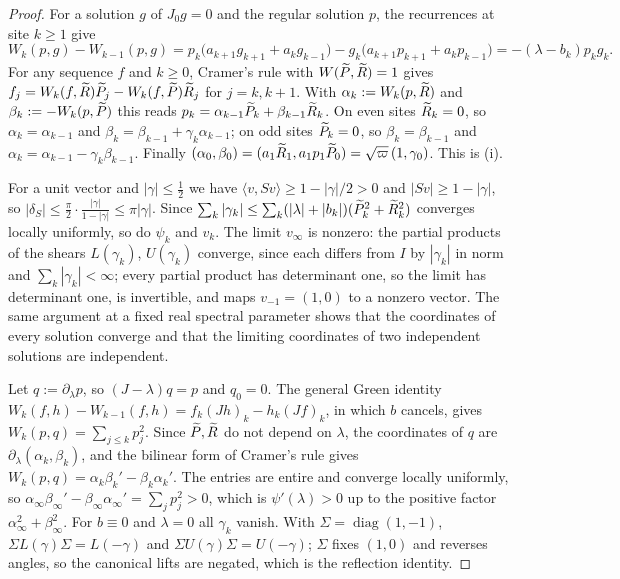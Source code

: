 \begin{proof}
 For a solution $g$ of $J_0g=0$ and the regular solution $p$, the
recurrences at site $k\ge1$ give
\[
  W_k(p,g)-W_{k-1}(p,g)=p_k\bigl(a_{k+1}g_{k+1}+a_kg_{k-1}\bigr)
  -g_k\bigl(a_{k+1}p_{k+1}+a_kp_{k-1}\bigr)=-(\lambda-b_k)p_kg_k .
\]
For any sequence $f$ and $k\ge0$, Cramer's rule with $W(\widetilde P,\widetilde R)=1$ gives
$f_j=W_k(f,\widetilde R)\widetilde P_j-W_k(f,\widetilde P)\widetilde R_j$ for $j=k,k+1$. With
$\alpha_k:=W_k(p,\widetilde R)$ and $\beta_k:=-W_k(p,\widetilde P)$ this reads
$p_k=\alpha_{k-1}\widetilde P_k+\beta_{k-1}\widetilde R_k$. On even sites $\widetilde R_k=0$, so
$\alpha_k=\alpha_{k-1}$ and $\beta_k=\beta_{k-1}+\gamma_k\alpha_{k-1}$; on odd sites
$\widetilde P_k=0$, so $\beta_k=\beta_{k-1}$ and $\alpha_k=\alpha_{k-1}-\gamma_k\beta_{k-1}$.
Finally $(\alpha_0,\beta_0)=(a_1\widetilde R_1,a_1p_1\widetilde P_0)=\sqrt{\varpi}\,(1,\gamma_0)$. This is (i).

 For a unit vector and $|\gamma|\le\frac12$ we have
$\langle v,Sv\rangle\ge1-|\gamma|/2>0$ and $|Sv|\ge1-|\gamma|$, so
$|\delta_S|\le\frac\pi2\cdot\frac{|\gamma|}{1-|\gamma|}\le\pi|\gamma|$. Since
$\sum_k|\gamma_k|\le\sum_k(|\lambda|+|b_k|)(\widetilde P_k^2+\widetilde R_k^2)$ converges locally uniformly,
so do $\psi_k$ and $v_k$. The limit $v_\infty$ is nonzero: the partial products of the shears
$L(\gamma_k)$, $U(\gamma_k)$ converge, since each differs from $I$ by $|\gamma_k|$ in norm and
$\sum_k|\gamma_k|<\infty$; every partial product has determinant one, so the limit has
determinant one, is invertible, and maps $v_{-1}=(1,0)$ to a nonzero vector. The same argument at a
fixed real spectral parameter shows that the coordinates of every solution converge and that the
limiting coordinates of two independent solutions are independent.

 Let $q:=\partial_\lambda p$, so $(J-\lambda)q=p$ and $q_0=0$. The
general Green identity $W_k(f,h)-W_{k-1}(f,h)=f_k(Jh)_k-h_k(Jf)_k$, in which $b$
cancels, gives $W_k(p,q)=\sum_{j\le k}p_j^2$. Since $\widetilde P,\widetilde R$ do not depend on $\lambda$,
the coordinates of $q$ are $\partial_\lambda(\alpha_k,\beta_k)$, and the bilinear form of
Cramer's rule gives $W_k(p,q)=\alpha_k\beta_k'-\beta_k\alpha_k'$. The entries are entire
and converge locally uniformly, so
$\alpha_\infty\beta_\infty'-\beta_\infty\alpha_\infty'=\sum_jp_j^2>0$, which is
$\psi'(\lambda)>0$ up to the positive factor $\alpha_\infty^2+\beta_\infty^2$. For
$b\equiv0$ and $\lambda=0$ all $\gamma_k$ vanish. With $\Sigma=\operatorname{diag}(1,-1)$,
$\Sigma L(\gamma)\Sigma=L(-\gamma)$ and $\Sigma U(\gamma)\Sigma=U(-\gamma)$; $\Sigma$ fixes
$(1,0)$ and reverses angles, so the canonical lifts are negated, which is the reflection
identity.


\end{proof}
